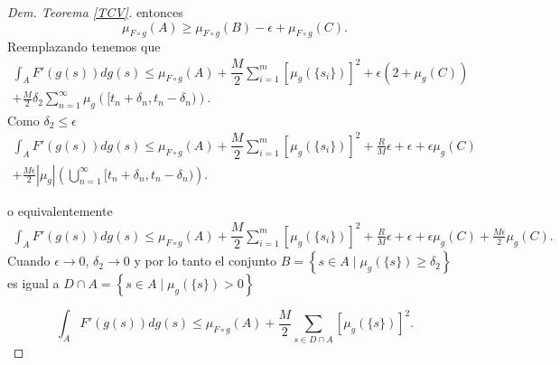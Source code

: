 \begin{proof}[Dem. Teorema \eqref{TCV}]
entonces
$$\mu_{F\circ g}(A)\geq \mu_{F\circ g}(B)-\epsilon+\mu_{F\circ g}(C).$$
Reemplazando tenemos que 
\begin{multline*}
	\int_{A}F'(g(s))dg(s) \leq \mu_{F\circ g}(A)+\dfrac{M}{2}\sum_{i=1}^{m} \left[ \mu_{g}(\{s_i\})\right] ^2+\epsilon\left(2+\mu_{g}(C)\right)  \\+\frac{M}{2}
	\delta_2\sum_{n=1}^{\infty} \mu_{g}\left( [t_n+\delta_n,t_n-\delta_n)\right). 
\end{multline*}
Como $\delta_2\leq\epsilon$
\begin{multline*}
	\int_{A}F'(g(s))dg(s) \leq \mu_{F\circ g}(A)+\dfrac{M}{2}\sum_{i=1}^{m} \left[ \mu_{g}(\{s_i\})\right] ^2+\frac{R}{M}\epsilon+\epsilon+\epsilon\mu_{g}\left(C\right)  \\+\frac{M\epsilon}{2}|\mu_{g}|\left( \bigcup_{n=1}^{\infty}[t_n+\delta_n,t_n-\delta_n)\right). 
\end{multline*}

o equivalentemente
\begin{multline*}
	\int_{A}F'(g(s))dg(s) \leq \mu_{F\circ g}(A)+\dfrac{M}{2}\sum_{i=1}^{m} \left[ \mu_{g}(\{s_i\})\right] ^2+\frac{R}{M}\epsilon+\epsilon+\epsilon\mu_{g}\left(C\right)  +\frac{M\epsilon}{2}\mu_{g}\left( C\right). 
\end{multline*}
Cuando $\epsilon \to 0$, $\delta_2\to 0$ y por lo tanto el conjunto $B=\left\lbrace s\in A\mid \mu_{g}(\{s\})\geq \delta_2\right\rbrace $ es igual a $D\cap A=\left\lbrace s\in A\mid \mu_{g}(\{s\})> 0\right\rbrace$

\begin{equation}
	\int_{A}F'(g(s))dg(s) \leq \mu_{F\circ g}(A)+\dfrac{M}{2}\sum_{s\in D\cap A} \left[ \mu_{g}(\{s\})\right] ^2. 
\end{equation}
\end{proof}

